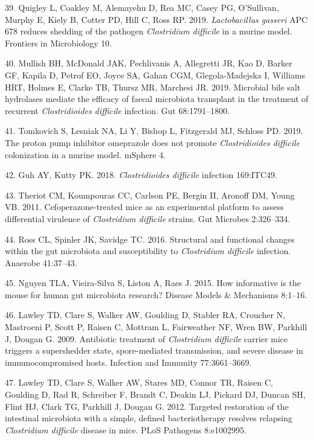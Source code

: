 \documentclass[11pt,]{article}
\begin{document}
\hypertarget{ref-Quigley2019}{}
39. Quigley L, Coakley M, Alemayehu D, Rea MC, Casey PG, O'Sullivan,
Murphy E, Kiely B, Cotter PD, Hill C, Ross RP. 2019. \emph{Lactobacillus
gasseri} APC 678 reduces shedding of the pathogen \emph{Clostridium
difficile} in a murine model. Frontiers in Microbiology 10.

\hypertarget{ref-Mullish2019}{}
40. Mullish BH, McDonald JAK, Pechlivanis A, Allegretti JR, Kao D,
Barker GF, Kapila D, Petrof EO, Joyce SA, Gahan CGM, Glegola-Madejska I,
Williams HRT, Holmes E, Clarke TB, Thursz MR, Marchesi JR. 2019.
Microbial bile salt hydrolases mediate the efficacy of faecal microbiota
transplant in the treatment of recurrent \emph{Clostridioides difficile}
infection. Gut 68:1791--1800.

\hypertarget{ref-Tomkovich2019}{}
41. Tomkovich S, Lesniak NA, Li Y, Bishop L, Fitzgerald MJ, Schloss PD.
2019. The proton pump inhibitor omeprazole does not promote
\emph{Clostridioides difficile} colonization in a murine model. mSphere
4.

\hypertarget{ref-Guh2018}{}
42. Guh AY, Kutty PK. 2018. \emph{Clostridioides difficile} infection
169:ITC49.

\hypertarget{ref-Theriot2011}{}
43. Theriot CM, Koumpouras CC, Carlson PE, Bergin II, Aronoff DM, Young
VB. 2011. Cefoperazone-treated mice as an experimental platform to
assess differential virulence of \emph{Clostridium difficile} strains.
Gut Microbes 2:326--334.

\hypertarget{ref-Ross2016}{}
44. Ross CL, Spinler JK, Savidge TC. 2016. Structural and functional
changes within the gut microbiota and susceptibility to
\emph{Clostridium difficile} infection. Anaerobe 41:37--43.

\hypertarget{ref-Nguyen2015}{}
45. Nguyen TLA, Vieira-Silva S, Liston A, Raes J. 2015. How informative
is the mouse for human gut microbiota research? Disease Models \&
Mechanisms 8:1--16.

\hypertarget{ref-Lawley2009}{}
46. Lawley TD, Clare S, Walker AW, Goulding D, Stabler RA, Croucher N,
Mastroeni P, Scott P, Raisen C, Mottram L, Fairweather NF, Wren BW,
Parkhill J, Dougan G. 2009. Antibiotic treatment of \emph{Clostridium
difficile} carrier mice triggers a supershedder state, spore-mediated
transmission, and severe disease in immunocompromised hosts. Infection
and Immunity 77:3661--3669.

\hypertarget{ref-Lawley2012}{}
47. Lawley TD, Clare S, Walker AW, Stares MD, Connor TR, Raisen C,
Goulding D, Rad R, Schreiber F, Brandt C, Deakin LJ, Pickard DJ, Duncan
SH, Flint HJ, Clark TG, Parkhill J, Dougan G. 2012. Targeted restoration
of the intestinal microbiota with a simple, defined bacteriotherapy
resolves relapsing \emph{Clostridium difficile} disease in mice. PLoS
Pathogens 8:e1002995.
\end{document}

